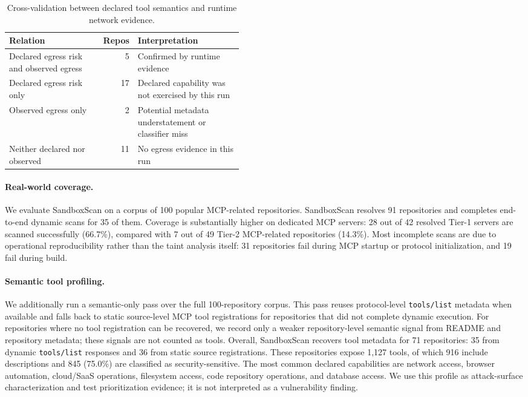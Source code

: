 \begin{table}[t]
\centering
\caption{Cross-validation between declared tool semantics and runtime network evidence.}
\label{tab:semantic-cross-validation}
\begin{tabular}{lrp{0.45\linewidth}}
\toprule
Relation & Repos & Interpretation \\
\midrule
Declared egress risk and observed egress & 5 & Confirmed by runtime evidence \\
Declared egress risk only & 17 & Declared capability was not exercised by this run \\
Observed egress only & 2 & Potential metadata understatement or classifier miss \\
Neither declared nor observed & 11 & No egress evidence in this run \\
\bottomrule
\end{tabular}
\end{table}

\paragraph{Real-world coverage.}
We evaluate SandboxScan on a corpus of 100 popular MCP-related repositories.
SandboxScan resolves 91 repositories and completes end-to-end dynamic scans
for 35 of them. Coverage is substantially higher on dedicated MCP servers:
28 out of 42 resolved Tier-1 servers are scanned successfully (66.7\%),
compared with 7 out of 49 Tier-2 MCP-related repositories (14.3\%).
Most incomplete scans are due to operational reproducibility rather than
the taint analysis itself: 31 repositories fail during MCP startup or
protocol initialization, and 19 fail during build.

\paragraph{Semantic tool profiling.}
We additionally run a semantic-only pass over the full 100-repository corpus.
This pass reuses protocol-level \texttt{tools/list} metadata when available
and falls back to static source-level MCP tool registrations for repositories
that did not complete dynamic execution. For repositories where no tool
registration can be recovered, we record only a weaker repository-level
semantic signal from README and repository metadata; these signals are not
counted as tools. Overall, SandboxScan recovers tool metadata for 71
repositories: 35 from dynamic \texttt{tools/list} responses and 36 from static
source registrations. These repositories expose 1,127 tools, of which 916
include descriptions and 845 (75.0\%) are classified as security-sensitive.
The most common declared capabilities are network access, browser automation,
cloud/SaaS operations, filesystem access, code repository operations, and
database access. We use this profile as attack-surface characterization and
test prioritization evidence; it is not interpreted as a vulnerability
finding.

